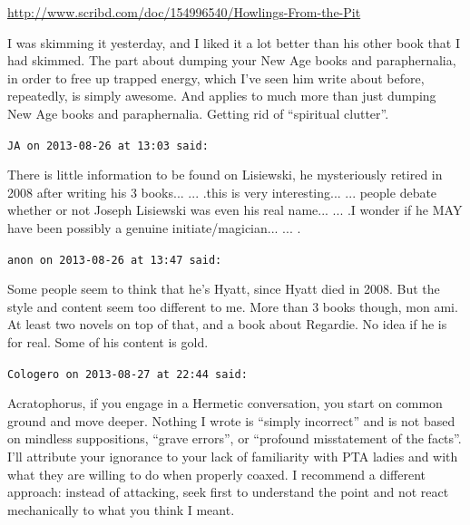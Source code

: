 \begin{footnotesize}
\begin{sffamily}
\url{http://www.scribd.com/doc/154996540/Howlings-From-the-Pit}


I was skimming it yesterday, and I liked it a lot better than his other book that I had skimmed. The part about dumping your New Age books and paraphernalia, in order to free up trapped energy, which I've seen him write about before, repeatedly, is simply awesome. And applies to much more than just dumping New Age books and paraphernalia. Getting rid of ``spiritual clutter''.

\hfill

\texttt{JA on 2013-08-26 at 13:03 said:}

There is little information to be found on Lisiewski, he mysteriously retired in 2008 after writing his 3 books... ... .this is very interesting... ... people debate whether or not Joseph Lisiewski was even his real name... ... .I wonder if he MAY have been possibly a genuine initiate/magician... ... .

\hfill

\texttt{anon on 2013-08-26 at 13:47 said:}

Some people seem to think that he's Hyatt, since Hyatt died in 2008. But the style and content seem too different to me. More than 3 books though, mon ami. At least two novels on top of that, and a book about Regardie. No idea if he is for real. Some of his content is gold.

\hfill

\texttt{Cologero on 2013-08-27 at 22:44 said:}

Acratophorus, if you engage in a Hermetic conversation, you start on common ground and move deeper. Nothing I wrote is ``simply incorrect'' and is not based on mindless suppositions, ``grave errors'', or ``profound misstatement of the facts''. I'll attribute your ignorance to your lack of familiarity with PTA ladies and with what they are willing to do when properly coaxed. I recommend a different approach: instead of attacking, seek first to understand the point and not react mechanically to what you think I meant.


\end{sffamily}
\end{footnotesize}

